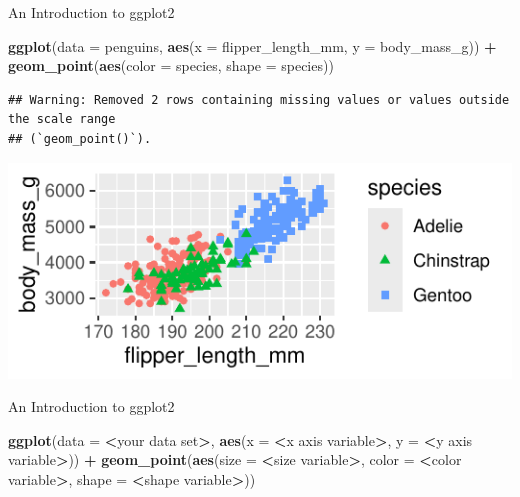 \documentclass[
  ignorenonframetext,
]{beamer}
\newenvironment{Shaded}{\begin{snugshade}}{\end{snugshade}}
\newcommand{\AttributeTok}[1]{\textcolor[rgb]{0.13,0.29,0.53}{#1}}
\newcommand{\FunctionTok}[1]{\textcolor[rgb]{0.13,0.29,0.53}{\textbf{#1}}}
\newcommand{\NormalTok}[1]{#1}
\newcommand{\SpecialCharTok}[1]{\textcolor[rgb]{0.81,0.36,0.00}{\textbf{#1}}}
\begin{document}
\begin{frame}[fragile]{An Introduction to ggplot2}
\label{an-introduction-to-ggplot2}
\begin{Shaded}
\begin{Highlighting}[]
\FunctionTok{ggplot}\NormalTok{(}\AttributeTok{data =}\NormalTok{ penguins, }\FunctionTok{aes}\NormalTok{(}\AttributeTok{x =}\NormalTok{ flipper\_length\_mm, }
                          \AttributeTok{y =}\NormalTok{ body\_mass\_g)) }\SpecialCharTok{+}
    \FunctionTok{geom\_point}\NormalTok{(}\FunctionTok{aes}\NormalTok{(}\AttributeTok{color =}\NormalTok{ species, }\AttributeTok{shape =}\NormalTok{ species))}
\end{Highlighting}
\end{Shaded}

\begin{verbatim}
## Warning: Removed 2 rows containing missing values or values outside the scale range
## (`geom_point()`).
\end{verbatim}

\includegraphics{M3-R-Basics_files/figure-beamer/unnamed-chunk-21-1.pdf}
\end{frame}

\begin{frame}[fragile]{An Introduction to ggplot2}
\label{an-introduction-to-ggplot2-1}
\begin{Shaded}
\begin{Highlighting}[]
\FunctionTok{ggplot}\NormalTok{(}\AttributeTok{data =} \SpecialCharTok{\textless{}}\NormalTok{your data set}\SpecialCharTok{\textgreater{}}\NormalTok{, }\FunctionTok{aes}\NormalTok{(}\AttributeTok{x =} \SpecialCharTok{\textless{}}\NormalTok{x axis variable}\SpecialCharTok{\textgreater{}}\NormalTok{, }
                                   \AttributeTok{y =} \SpecialCharTok{\textless{}}\NormalTok{y axis variable}\SpecialCharTok{\textgreater{}}\NormalTok{)) }\SpecialCharTok{+}
    \FunctionTok{geom\_point}\NormalTok{(}\FunctionTok{aes}\NormalTok{(}\AttributeTok{size =} \SpecialCharTok{\textless{}}\NormalTok{size variable}\SpecialCharTok{\textgreater{}}\NormalTok{, }
                   \AttributeTok{color =} \SpecialCharTok{\textless{}}\NormalTok{color variable}\SpecialCharTok{\textgreater{}}\NormalTok{, }
                   \AttributeTok{shape =} \SpecialCharTok{\textless{}}\NormalTok{shape variable}\SpecialCharTok{\textgreater{}}\NormalTok{))}
\end{Highlighting}
\end{Shaded}
\end{frame}
\end{document}
